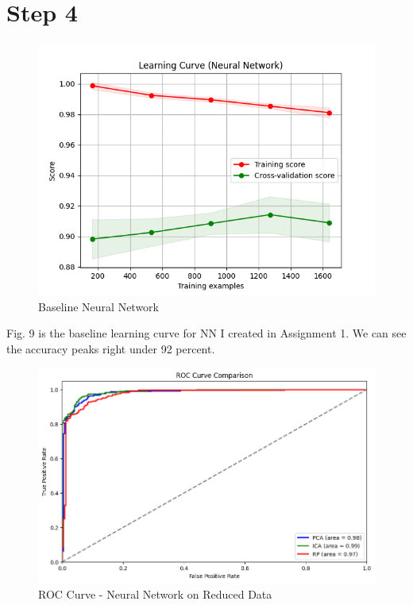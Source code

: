 \documentclass[conference]{IEEEtran}
\begin{document}
\section{Step 4}
\begin{figure}
    \centering
    \includegraphics[width=0.8\linewidth]{figures//housing_figures/baseline_learning_curve_nn.png}
    \caption{Baseline Neural Network}
    \label{fig:baseline}
\end{figure}
Fig. 9 is the baseline learning curve for NN I created in Assignment 1. We can see the accuracy peaks right under 92 percent.
\begin{table}[htp]
    \centering
    \caption{Performance Metrics for PCA, ICA, and RP}
    \label{tab:performance_metrics}
    \resizebox{\columnwidth}{!}{%
    \begin{tabular}{lcccc}
    \toprule
    \textbf{Method} & \textbf{Accuracy} & \textbf{Training Time (s)} & \textbf{Prediction Time (s)} & \textbf{F1-Score Avg} \\
    \midrule
    \textbf{PCA} & 0.9334 & 3.4113 & 0.00041 & 0.93 \\
    \textbf{ICA} & 0.9471 & 2.6668 & 0.00051 & 0.95 \\
    \textbf{RP}  & 0.9181 & 2.1919 & 0.00032 & 0.92 \\
    \bottomrule
    \end{tabular}%
    }
\end{table}
\begin{figure}
        \centering
        \includegraphics[width=1\linewidth]{figures//housing_figures/ROC_curve_dim_reduction.png}
        \caption{ROC Curve - Neural Network on Reduced Data}
        \label{fig:enter-label}
    \end{figure}
\end{document}
